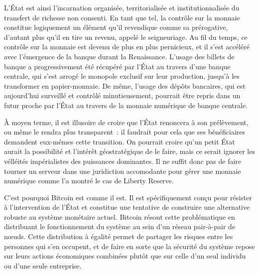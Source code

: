 L'État est ainsi l'incarnation organisée, territorialisée et institutionnalisée du transfert de richesse non consenti. En tant que tel, la contrôle sur la monnaie constitue logiquement un élément qu'il revendique comme sa prérogative, d'autant plus qu'il en tire un revenu, appelé le seigneuriage. Au fil du temps, ce contrôle sur la monnaie est devenu de plus en plus pernicieux, et il s'est accéléré avec l'émergence de la banque durant la Renaissance. L'usage des billets de banque a progressivement été récupéré par l'État au travers d'une banque centrale, qui s'est arrogé le monopole exclusif sur leur production, jusqu'à les transformer en papier-monnaie. De même, l'usage des dépôts bancaires, qui est aujourd'hui surveillé et contrôlé minutieusement, pourrait être repris dans un futur proche par l'État au travers de la monnaie numérique de banque centrale.

À moyen terme, il est illusoire de croire que l'État renoncera à son prélèvement, ou même le rendra plus transparent~: il faudrait pour cela que ses bénéficiaires demandent eux-mêmes cette transition. On pourrait croire qu'un petit État aurait la possibilité et l'intérêt géostratégique de le faire, mais ce serait ignorer les vélléités impérialistes des puissances dominantes. Il ne suffit donc pas de faire tourner un serveur dans une juridiction accomodante pour gérer une monnaie numérique comme l'a montré le cas de Liberty Reserve.

C'est pourquoi Bitcoin est comme il est. Il est spécifiquement conçu pour résister à l'intervention de l'État et constitue une tentative de construire une alternative robuste au système monétaire actuel. Bitcoin résout cette problématique en distribuant le fonctionnement du système au sein d'un réseau pair-à-pair de nœuds. Cette distribution à égalité permet de partager les risques entre les personnes qui s'en occupent, et de faire en sorte que la sécurité du système repose sur leurs actions économiques combinées plutôt que sur celle d'un seul individu ou d'une seule entreprise. %